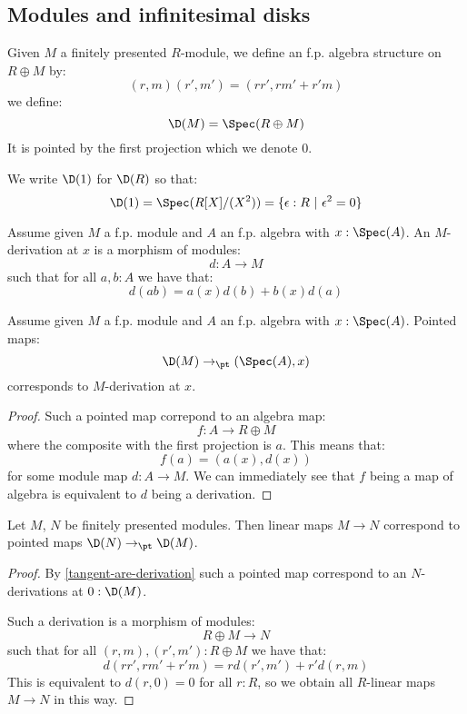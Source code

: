 
\subsection{Modules and infinitesimal disks}

\begin{definition}
Given $M$ a finitely presented $R$-module, we define an f.p. algebra structure on $R\oplus M$ by:
\[(r,m)(r',m') = (rr',rm'+r'm)\]
we define:
\[\D(M) = \Spec(R\oplus M)\]
It is pointed by the first projection which we denote $0$. 
\end{definition}

We write $\D(1)$ for $\D(R)$ so that:
\[\D(1) = \Spec(R[X]/(X^2)) = \{\epsilon:R\ |\ \epsilon^2=0\}\]

\begin{definition}
Assume given $M$ a f.p. module and $A$ an f.p. algebra with $x:\Spec(A)$. An $M$-derivation at $x$ is a morphism of modules:
\[d:A\to M\]
such that for all $a,b:A$ we have that:
\[d(ab) = a(x)d(b) + b(x)d(a)\]
\end{definition}

\begin{lemma}\label{tangent-are-derivation}
Assume given $M$ a f.p. module and $A$ an f.p. algebra with $x:\Spec(A)$. Pointed maps:
\[\D(M)\to_\pt (\Spec(A),x)\] 
corresponds to $M$-derivation at $x$.
\end{lemma}

\begin{proof}
Such a pointed map correpond to an algebra map:
\[f : A\to R\oplus M\]
where the composite with the first projection is $a$. This means that:
\[f(a) = (a(x),d(x))\]
for some module map $d:A\to M$. We can immediately see that $f$ being a map of algebra is equivalent to $d$ being a derivation.
\end{proof}

\begin{lemma}\label{equivalence-module-infinitesimal}
Let $M$, $N$ be finitely presented modules. Then linear maps $M \to N$ correspond to
pointed maps $\D(N) \to_\pt \D(M)$. 
\end{lemma}

\begin{proof}
By \cref{tangent-are-derivation} such a pointed map correspond to an $N$-derivations at $0:\D(M)$.

Such a derivation is a morphism of modules:
\[R\oplus M\to N\]
such that for all $(r,m),(r',m'):R\oplus M$ we have that:
\[d(rr',rm'+r'm) = rd(r',m')+r'd(r,m)\]
This is equivalent to $d(r,0) = 0$ for all $r : R$, so we obtain all $R$-linear 
maps $M \to N$ in this way.
\end{proof}

